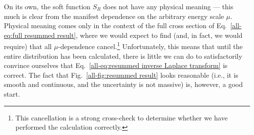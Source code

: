 \documentclass[../thesis.tex]{subfiles}
\begin{document}
	On its own, the soft function $S_R$ does not have any physical meaning --- this much is clear from the manifest dependence on the arbitrary energy scale $\mu$. Physical meaning comes only in the context of the full cross section of Eq.~\ref{all-eq:full resummed result}, where we would expect to find (and, in fact, we would require) that all $\mu$-dependence cancel.\footnote{This cancellation is a strong cross-check to determine whether we have performed the calculation correctly.} Unfortunately, this means that until the entire distribution has been calculated, there is little we can do to satisfactorily convince ourselves that Eq.~\ref{all-eq:resummed inverse Laplace transform} is correct. The fact that Fig.~\ref{all-fig:resummed result} looks reasonable (i.e., it is smooth and continuous, and the uncertainty is not massive) is, however, a good start.


%  
% 
\end{document}
